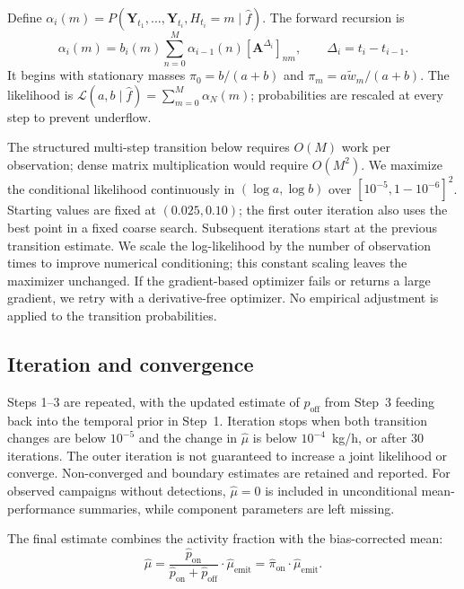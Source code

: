 \documentclass[11pt]{article}
\begin{document}
Define $\alpha_i(m)=P(\mathbf Y_{t_1},\ldots,\mathbf Y_{t_i},H_{t_i}=m\mid\hat f)$. The forward recursion is
\begin{equation}
 \alpha_i(m)=b_i(m)\sum_{n=0}^{M}\alpha_{i-1}(n)[\mathbf A^{\Delta_i}]_{nm},
 \qquad \Delta_i=t_i-t_{i-1}.
\end{equation}
It begins with stationary masses $\pi_0=b/(a+b)$ and $\pi_m=a\tilde w_m/(a+b)$. The likelihood is $\mathcal L(a,b\mid\hat f)=\sum_{m=0}^{M}\alpha_N(m)$; probabilities are rescaled at every step to prevent underflow.

The structured multi-step transition below requires $O(M)$ work per observation; dense matrix multiplication would require $O(M^2)$. We maximize the conditional likelihood continuously in $(\log a,\log b)$ over $[10^{-5},1-10^{-6}]^2$. Starting values are fixed at $(0.025,0.10)$; the first outer iteration also uses the best point in a fixed coarse search. Subsequent iterations start at the previous transition estimate. We scale the log-likelihood by the number of observation times to improve numerical conditioning; this constant scaling leaves the maximizer unchanged. If the gradient-based optimizer fails or returns a large gradient, we retry with a derivative-free optimizer. No empirical adjustment is applied to the transition probabilities.

\subsection{Iteration and convergence}

Steps 1--3 are repeated, with the updated estimate of $p_{\text{off}}$ from Step~3 feeding back into the temporal prior in Step~1. Iteration stops when both transition changes are below $10^{-5}$ and the change in $\hat\mu$ is below $10^{-4}$~kg/h, or after 30 iterations. The outer iteration is not guaranteed to increase a joint likelihood or converge. Non-converged and boundary estimates are retained and reported. For observed campaigns without detections, $\hat\mu=0$ is included in unconditional mean-performance summaries, while component parameters are left missing.

The final estimate combines the activity fraction with the bias-corrected mean:
\begin{equation}
    \hat{\mu} = \frac{\hat{p}_{\text{on}}}{\hat{p}_{\text{on}} + \hat{p}_{\text{off}}} \cdot \hat{\mu}_{\text{emit}} = \hat{\pi}_{\text{on}} \cdot \hat{\mu}_{\text{emit}}.
\end{equation}
\end{document}
